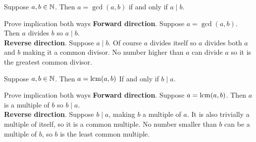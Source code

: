 \documentclass{article}
\begin{document}
\begin{problem}
Suppose \(a, b \in \mathbb{N}\). Then \(a = \gcd(a, b)\) if and only if \(a \mid b\).
\end{problem}
\begin{solution}{Prove implication both ways}
    \textbf{Forward direction}. Suppose \(a = \gcd(a, b)\). Then \(a\) divides \(b\) so \(a \mid b\).
    \\

    \textbf{Reverse direction}. Suppose \(a \mid b\). Of course \(a\) divides itself so \(a\) divides both \(a\) and \(b\) making it a common divisor. No number higher than \(a\) can divide \(a\) so it is the greatest common divisor.
\end{solution}
\begin{problem}
Suppose \(a, b \in \mathbb{N}\). Then \(a = \operatorname{lcm}(a, b)\) If and only if \(b \mid a\).
\end{problem}
\begin{solution}{Prove implication both ways}
    \textbf{Forward direction}. Suppose \(a = \operatorname{lcm}(a, b)\). Then \(a\) is a multiple of \(b\) so \(b \mid a\).
    \\

    \textbf{Reverse direction}. Suppose \(b \mid a\), making \(b\) a multiple of \(a\). It is also trivially a multiple of itself, so it is a common multiple. No number smaller than \(b\) can be a multiple of \(b\), so \(b\) is the least common multiple.
\end{solution}
\end{document}
